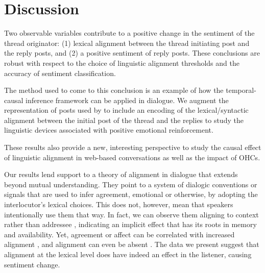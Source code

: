 \documentclass[man,biblatex,floatsintext]{apa6}
\begin{document}
\section{Discussion}






 
Two observable variables contribute to  a  positive  change  in  the  sentiment  of  the thread originator: (1) lexical  alignment  between the thread initiating post and the reply posts, and (2) a positive sentiment  of  reply  posts.  These conclusions are robust with respect to the choice of linguistic alignment thresholds and the accuracy of sentiment classification. 

The method used to come to this conclusion is  an example of how the temporal-causal inference framework \parencite{bui2016temporal} can be applied in dialogue.
 We augment the representation of posts used by \textcite{bui2016temporal} to include an encoding of the lexical/syntactic alignment between the initial post of the thread and the replies to study the linguistic devices associated with positive emotional reinforcement. 
 
These results also provide a new, interesting perspective to study the causal effect of linguistic alignment in web-based conversations as well as the impact of OHCs. 


Our results lend support to a theory of alignment in dialogue that extends beyond mutual understanding.  They point to a system of dialogic conventions or signals that are used to infer agreement, emotional or otherwise, by adopting the interlocutor's lexical choices.  This does not, however, mean that speakers intentionally use them that way.  In fact, we can observe them aligning to context rather than addressee \parencite{reitter2017alignment,wang2014linguistic}, indicating an implicit effect that has its roots in memory and availability.  Yet, agreement or affect can be correlated with increased alignment \parencite{danescu2011chameleons}, and alignment can even be absent \parencite{healey2014divergence}.  The data we present suggest that alignment at the lexical level does have indeed an effect in the listener, causing sentiment change.
\end{document}

